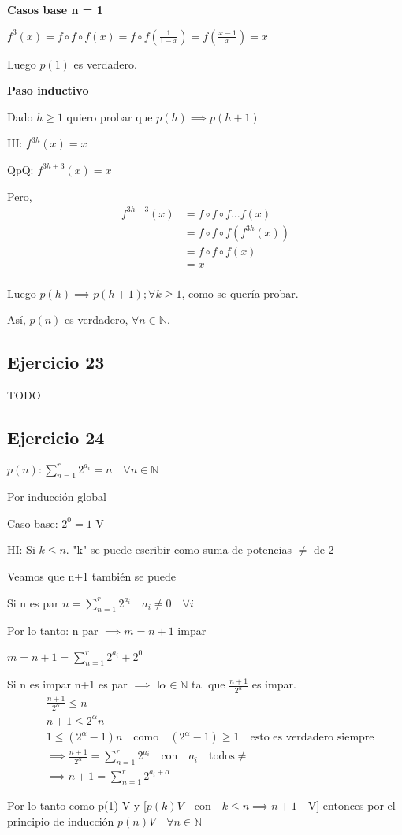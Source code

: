 \textbf{Casos base n = 1}

$f^{3}(x) = f \circ f \circ f(x) = f \circ f(\frac{1}{1-x}) = f(\frac{x-1}{x}) = x$

Luego $ p(1) $ es verdadero.

\textbf{Paso inductivo}

Dado $ h\geq 1 $ quiero probar que $ p(h) \implies p(h+1) $

HI: $ f^{3h}(x) = x $

QpQ: $ f^{3h+3}(x) = x$

Pero,
\begin{align*}
   f^{3h+3}(x) &= f \circ f \circ f ... f(x) \\
   &= f \circ f \circ f (f^{3h}(x)) \\
   &= f \circ f \circ f (x) \\
   &= x \\
\end{align*}

Luego $p(h) \implies p(h+1); \forall k \geq 1$, como se quería probar.

Así, $p(n)$ es verdadero, $\forall n \in \mathbb{N}$.

\subsection{Ejercicio 23}
TODO

\subsection{Ejercicio 24}
$p(n): \sum_{n=1}^{r}2^{a_i} = n \quad \forall n \in \mathbb N$

Por inducción global

Caso base: $2^0 = 1$  V

HI: Si $k\leqslant n$. "k" se puede escribir como suma de potencias $\neq$ de 2

Veamos que n+1 también se puede

Si n es par $n=\sum_{n=1}^{r}2^{a_i}  \quad  a_i \neq0  \quad \forall i$

Por lo tanto: n par $\implies m=n+1$ impar

$m=n+1=\sum_{n=1}^{r}2^{a_i}  + 2^0$

Si n es impar n+1 es par $\implies \exists \alpha \in\mathbb N$ tal que  $\frac{n+1}{2^\alpha}$ es impar.
\begin{align*}
& \frac{n+1}{2^\alpha} \leqslant n \\
& n+1\leqslant 2^\alpha n \\
& 1\leqslant  (2^\alpha -1)n  \quad \text{como} \quad (2^\alpha -1)\geqslant 1 \quad \text {esto es verdadero siempre} \\
& \implies \frac{n+1}{2^\alpha}  = \sum_{n=1}^{r}2^{a_i} \quad \text{con} \quad a_i \quad \text{todos}  \neq \\
& \implies n+1 = \sum_{n=1}^{r}2^{a_i+\alpha} 
\end{align*}

Por lo tanto como p(1) V y [$p(k) V \quad \text{con}\quad k\leqslant n \implies n+1 \quad \text{V}$]  entonces por el principio de inducción $p(n) V \quad \forall  n \in \mathbb N$

